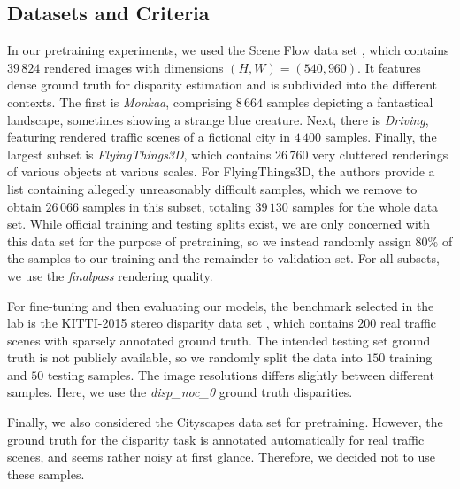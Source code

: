 \documentclass[runningheads]{llncs}
\begin{document}
\subsection{Datasets and Criteria}
In our pretraining experiments, we used the Scene Flow data set \cite{SceneFlow}, which contains $39\,824$ rendered images with dimensions $(H, W)=(540, 960)$. It features dense ground truth for disparity estimation and is subdivided into the different contexts. The first is \textit{Monkaa}, comprising $8\,664$ samples depicting a fantastical landscape, sometimes showing a strange blue creature. Next, there is \textit{Driving}, featuring rendered traffic scenes of a fictional city in $4\,400$ samples. Finally, the largest subset is \textit{FlyingThings3D}, which contains $26\,760$ very cluttered renderings of various objects at various scales. For FlyingThings3D, the authors provide a list containing allegedly unreasonably difficult samples, which we remove to obtain $26\,066$ samples in this subset, totaling $39\,130$ samples for the whole data set. While official training and testing splits exist, we are only concerned with this data set for the purpose of pretraining, so we instead randomly assign $80 \%$ of the samples to our training and the remainder to validation set. For all subsets, we use the \textit{finalpass} rendering quality.

For fine-tuning and then evaluating our models, the benchmark selected in the lab is the KITTI-2015 stereo disparity data set \cite{KITTI2015}, which contains $200$ real traffic scenes with sparsely annotated ground truth. The intended testing set ground truth is not publicly available, so we randomly split the data into $150$ training and $50$ testing samples. The image resolutions differs slightly between different samples. Here, we use the \textit{disp\_noc\_0} ground truth disparities.

Finally, we also considered the Cityscapes data set \cite{Cityscapes} for pretraining. However, the ground truth for the disparity task is annotated automatically for real traffic scenes, and seems rather noisy at first glance. Therefore, we decided not to use these samples.
\end{document}
